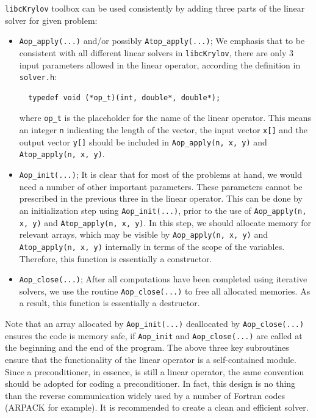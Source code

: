 \documentclass[10pt]{article}
\begin{document}
\verb|libcKrylov| toolbox can be used consistently by adding three parts of the linear solver for given problem:
\begin{itemize}
\item \verb|Aop_apply(...)| and/or possibly \verb|Atop_apply(...)|;
  We emphasis that to be consistent with all different linear solvers in \verb|libcKrylov|,  there are only 3 input parameters allowed in the linear operator, according the definition in \verb|solver.h|:
\begin{verbatim}
  typedef void (*op_t)(int, double*, double*);
\end{verbatim}
where \verb|op_t| is the placeholder for the name of the linear operator.
This means an integer \verb|n| indicating the length of the vector, the input vector \verb|x[]| and the output vector \verb|y[]| should be included in \verb|Aop_apply(n, x, y)| and \verb|Atop_apply(n, x, y)|.

\item \verb|Aop_init(...)|;
  It is clear that for most of the problems at hand, we would need a number of other important parameters. These parameters cannot be prescribed in the previous three in the linear operator. This can be done by an initialization step using \verb|Aop_init(...)|, prior to the use of \verb|Aop_apply(n, x, y)| and \verb|Atop_apply(n, x, y)|. In this step, we should allocate memory for relevant arrays, which may be visible by \verb|Aop_apply(n, x, y)| and \verb|Atop_apply(n, x, y)| internally in terms of the scope of the variables. Therefore, this function is essentially a constructor.

\item \verb|Aop_close(...)|;
  After all computations have been completed using iterative solvers, we use the routine \verb|Aop_close(...)| to free all allocated memories.   As a result, this function is essentially a destructor.
  
\end{itemize}
Note that an array allocated by \verb|Aop_init(...)| deallocated by \verb|Aop_close(...)| ensures the code is memory safe, if \verb|Aop_init| and \verb|Aop_close(...)| are called at the beginning and the end of the program.
The above three key subroutines ensure that the functionality of the linear operator is a self-contained module. Since a preconditioner, in essence, is still a linear operator, the same convention  should be adopted for coding a preconditioner. In fact, this design is no thing than the reverse communication \citep{markus2012modern} widely used by a number of Fortran codes (ARPACK for example). It is recommended to create a clean and efficient solver.
\end{document}

